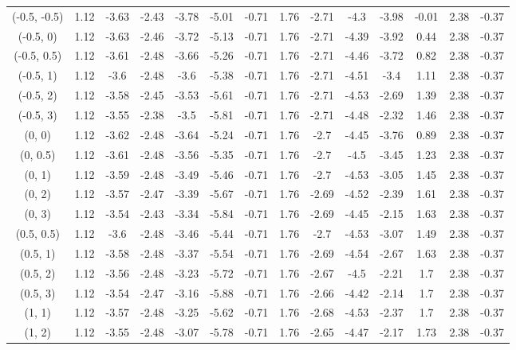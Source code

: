 \documentclass[11pt,a4paper,twoside,openany]{book}\usepackage{knitr}
\begin{document}
{\begin{knitrout}
\begin{table}
\begin{tabular}[t]{cccccccccccccc}
\addlinespace
(-0.5, -0.5) & 1.12 & -3.63 & -2.43 & -3.78 & -5.01 & -0.71 & 1.76 & -2.71 & -4.3 & -3.98 & -0.01 & 2.38 & -0.37\\
(-0.5, 0) & 1.12 & -3.63 & -2.46 & -3.72 & -5.13 & -0.71 & 1.76 & -2.71 & -4.39 & -3.92 & 0.44 & 2.38 & -0.37\\
(-0.5, 0.5) & 1.12 & -3.61 & -2.48 & -3.66 & -5.26 & -0.71 & 1.76 & -2.71 & -4.46 & -3.72 & 0.82 & 2.38 & -0.37\\
(-0.5, 1) & 1.12 & -3.6 & -2.48 & -3.6 & -5.38 & -0.71 & 1.76 & -2.71 & -4.51 & -3.4 & 1.11 & 2.38 & -0.37\\
(-0.5, 2) & 1.12 & -3.58 & -2.45 & -3.53 & -5.61 & -0.71 & 1.76 & -2.71 & -4.53 & -2.69 & 1.39 & 2.38 & -0.37\\
\addlinespace
(-0.5, 3) & 1.12 & -3.55 & -2.38 & -3.5 & -5.81 & -0.71 & 1.76 & -2.71 & -4.48 & -2.32 & 1.46 & 2.38 & -0.37\\
(0, 0) & 1.12 & -3.62 & -2.48 & -3.64 & -5.24 & -0.71 & 1.76 & -2.7 & -4.45 & -3.76 & 0.89 & 2.38 & -0.37\\
(0, 0.5) & 1.12 & -3.61 & -2.48 & -3.56 & -5.35 & -0.71 & 1.76 & -2.7 & -4.5 & -3.45 & 1.23 & 2.38 & -0.37\\
(0, 1) & 1.12 & -3.59 & -2.48 & -3.49 & -5.46 & -0.71 & 1.76 & -2.7 & -4.53 & -3.05 & 1.45 & 2.38 & -0.37\\
(0, 2) & 1.12 & -3.57 & -2.47 & -3.39 & -5.67 & -0.71 & 1.76 & -2.69 & -4.52 & -2.39 & 1.61 & 2.38 & -0.37\\
\addlinespace
(0, 3) & 1.12 & -3.54 & -2.43 & -3.34 & -5.84 & -0.71 & 1.76 & -2.69 & -4.45 & -2.15 & 1.63 & 2.38 & -0.37\\
(0.5, 0.5) & 1.12 & -3.6 & -2.48 & -3.46 & -5.44 & -0.71 & 1.76 & -2.7 & -4.53 & -3.07 & 1.49 & 2.38 & -0.37\\
(0.5, 1) & 1.12 & -3.58 & -2.48 & -3.37 & -5.54 & -0.71 & 1.76 & -2.69 & -4.54 & -2.67 & 1.63 & 2.38 & -0.37\\
(0.5, 2) & 1.12 & -3.56 & -2.48 & -3.23 & -5.72 & -0.71 & 1.76 & -2.67 & -4.5 & -2.21 & 1.7 & 2.38 & -0.37\\
(0.5, 3) & 1.12 & -3.54 & -2.47 & -3.16 & -5.88 & -0.71 & 1.76 & -2.66 & -4.42 & -2.14 & 1.7 & 2.38 & -0.37\\
\addlinespace
(1, 1) & 1.12 & -3.57 & -2.48 & -3.25 & -5.62 & -0.71 & 1.76 & -2.68 & -4.53 & -2.37 & 1.7 & 2.38 & -0.37\\
(1, 2) & 1.12 & -3.55 & -2.48 & -3.07 & -5.78 & -0.71 & 1.76 & -2.65 & -4.47 & -2.17 & 1.73 & 2.38 & -0.37\\

\end{tabular}
\end{table}
\end{knitrout}}
\end{document}
